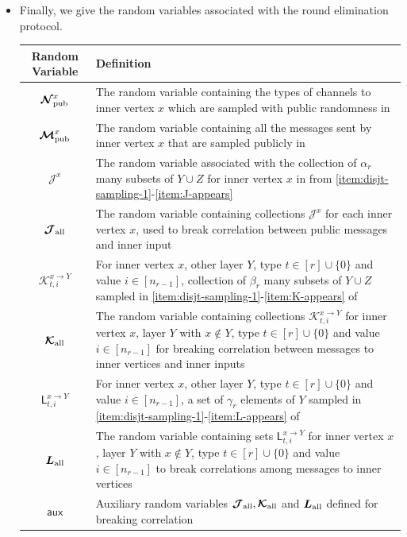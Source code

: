 \documentclass[11pt]{article}
\theoremstyle{definition}
\newcommand{\rv}[1]{\ensuremath{{\mathsf{#1}}}\xspace}
\newcommand{\raux}{\ensuremath{\rv{aux}}}
\newcommand{\cJ}{\ensuremath{\mathcal{J}}}
\newcommand{\cK}{\ensuremath{\mathcal{K}}}
\newcommand{\rcJup}[1]{\ensuremath{\bm{\cJ}^{#1}}}
\newcommand{\rcKupdown}[2]{\ensuremath{\bm{\cK}^{#1}_{#2}}}
\newcommand{\rLupdown}[2]{\ensuremath{\rv{L}^{#1}_{#2}}}
\newcommand{\rcJall}{\ensuremath{\bm{\mathcal{J}}_{\textnormal{all}}}}
\newcommand{\rcKall}{\ensuremath{\bm{\mathcal{K}}_{\textnormal{all}}}}
\newcommand{\rLall}{\ensuremath{\bm{L}_{\textnormal{all}}}}
\newcommand{\rNpub}[1]{\ensuremath{\bm{\mathcal{N}}_{\textnormal{pub}}^{#1}}}
\newcommand{\rMpub}[1]{\ensuremath{\bm{\mathcal{M}}_{\textnormal{pub}}^{#1}}}
\begin{document}
\begin{itemize}
\item Finally, we give the random variables associated with the round elimination protocol. 
\begin{center}
	\begin{tabular}{|c|p{10cm}|}
		\hline
		\textbf{Random Variable}  & \textbf{Definition} \\
		\hline
		$\rNpub{x}$ & The random variable containing the types of channels to inner vertex $x$ which are sampled with public randomness in \Cref{box:r-1-step1-ids} \\
		$\rMpub{x}$ & The random variable containing all the messages sent by inner vertex $x$ that are sampled publicly in \Cref{box:r-1-step1-ids} \\
		$\rcJup{x}$ & The random variable associated with the collection of $\alpha_r$ many subsets of $Y \cup Z$ for inner vertex $x$ in \Cref{box:cGtilr-definition} from \ref{item:disjt-sampling-1}-\ref{item:J-appears} \\
		$\rcJall$ &The random variable containing collections $\rcJup{x}$ for each inner vertex $x$, used to break correlation between public messages and inner input\\
		$\rcKupdown{x \to Y}{t, i}$ & For inner vertex $x$, other layer $Y$, type $t \in [r] \cup \{0\}$ and value $i \in[n_{r-1}]$, collection of $\beta_r$ many subsets of $Y \cup Z$ sampled in \ref{item:disjt-sampling-1}-\ref{item:K-appears} of \Cref{box:cGtilr-definition} \\
		$\rcKall$ & The random variable containing collections $\rcKupdown{x \to Y}{t, i}$ for inner vertex $x$, layer $Y$ with $x \notin Y$, type $t \in [r] \cup \{0\}$ and value $i \in [n_{r-1}]$ for breaking correlation between messages to inner vertices and inner inputs  \\
		$\rLupdown{x \to Y}{t, i}$ & For inner vertex $x$, other layer $Y$, type $t \in [r] \cup \{0\}$ and value $i \in[n_{r-1}]$, a set of $\gamma_r$ elements of $Y$ sampled in \ref{item:disjt-sampling-1}-\ref{item:L-appears} of \Cref{box:cGtilr-definition} \\
		$\rLall$ & The random variable containing sets $\rLupdown{x \to Y}{t, i}$ for  inner vertex $x$, layer $Y$ with $x \notin Y$, type $t \in [r] \cup \{0\}$ and value $i \in [n_{r-1}]$ to break correlations among messages to inner vertices  \\
		$ \raux$ & Auxiliary random variables $\rcJall, \rcKall$ and $\rLall$ defined for breaking correlation \\
		\hline
	\end{tabular}
\end{center}
\end{itemize}
\end{document}
